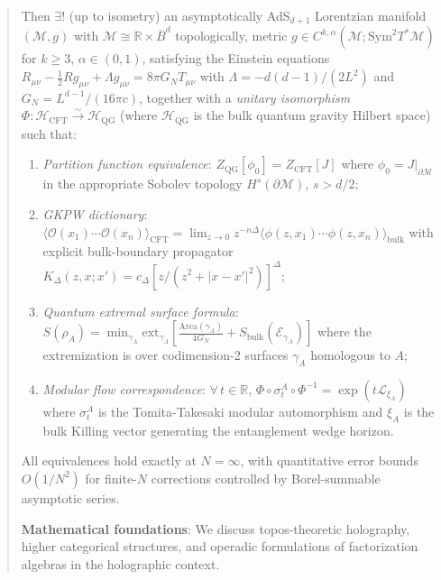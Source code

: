 \documentclass[12pt,a4paper]{article}
\begin{document}
\begin{abstract}
\begin{itemize}
\end{itemize}
Then $\exists!$ (up to isometry) an asymptotically AdS$_{d+1}$ Lorentzian manifold $(\mathcal{M}, g)$ with $\mathcal{M} \cong \mathbb{R} \times \overline{B}^d$ topologically, metric $g \in C^{k,\alpha}(\mathcal{M}; \text{Sym}^2 T^*\mathcal{M})$ for $k \geq 3$, $\alpha \in (0,1)$, satisfying the Einstein equations $R_{\mu\nu} - \frac{1}{2}Rg_{\mu\nu} + \Lambda g_{\mu\nu} = 8\pi G_N T_{\mu\nu}$ with $\Lambda = -d(d-1)/(2L^2)$ and $G_N = L^{d-1}/(16\pi c)$, together with a \emph{unitary isomorphism} $\Phi: \mathcal{H}_{\text{CFT}} \xrightarrow{\sim} \mathcal{H}_{\text{QG}}$ (where $\mathcal{H}_{\text{QG}}$ is the bulk quantum gravity Hilbert space) such that:
\begin{enumerate}
\item[(i)] \emph{Partition function equivalence}: $Z_{\text{QG}}[\phi_0] = Z_{\text{CFT}}[J]$ where $\phi_0 = J|_{\partial\mathcal{M}}$ in the appropriate Sobolev topology $H^{s}(\partial\mathcal{M})$, $s > d/2$;
\item[(ii)] \emph{GKPW dictionary}: $\langle\mathcal{O}(x_1)\cdots\mathcal{O}(x_n)\rangle_{\text{CFT}} = \lim_{z\to 0} z^{-n\Delta} \langle\phi(z,x_1)\cdots\phi(z,x_n)\rangle_{\text{bulk}}$ with explicit bulk-boundary propagator $K_\Delta(z,x;x') = c_\Delta[z/(z^2 + |x-x'|^2)]^\Delta$;
\item[(iii)] \emph{Quantum extremal surface formula}: $S(\rho_A) = \min_{\gamma_A}\text{ext}_{\gamma_A}\left[\frac{\text{Area}(\gamma_A)}{4G_N} + S_{\text{bulk}}(\mathcal{E}_{\gamma_A})\right]$ where the extremization is over codimension-2 surfaces $\gamma_A$ homologous to $A$;
\item[(iv)] \emph{Modular flow correspondence}: $\forall\, t \in \mathbb{R}$, $\Phi \circ \sigma_t^A \circ \Phi^{-1} = \exp(t\mathcal{L}_{\xi_A})$ where $\sigma_t^A$ is the Tomita-Takesaki modular automorphism and $\xi_A$ is the bulk Killing vector generating the entanglement wedge horizon.
\end{enumerate}
All equivalences hold exactly at $N = \infty$, with quantitative error bounds $O(1/N^2)$ for finite-$N$ corrections controlled by Borel-summable asymptotic series.

\textbf{Mathematical foundations}: We discuss topos-theoretic holography, higher categorical structures, and operadic formulations of factorization algebras in the holographic context.


\end{abstract}
\end{document}
